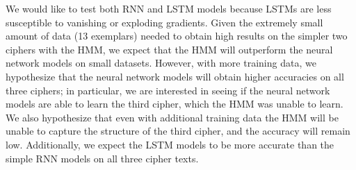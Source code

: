 \documentclass{article}
\begin{document}
We would like to test both RNN and LSTM models because LSTMs are less susceptible to vanishing or exploding gradients. Given the extremely small amount of data (13 exemplars) needed to obtain high results on the simpler two ciphers with the HMM, we expect that the HMM will outperform the neural network models on small datasets. However, with more training data, we hypothesize that the neural network models will obtain higher accuracies on all three ciphers; in particular, we are interested in seeing if the neural network models are able to learn the third cipher, which the HMM was unable to learn. We also hypothesize that even with additional training data the HMM will be unable to capture the structure of the third cipher, and the accuracy will remain low. Additionally, we expect the LSTM models to be more accurate than the simple RNN models on all three cipher texts. 




 
\end{document}
